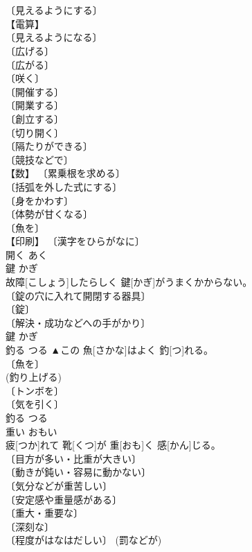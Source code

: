 \documentclass[8pt]{extreport}
\begin{document}
\begin{CJK}{UTF8}{min}
\\	[⇒ひらいた, ひらかれる] 
\\	〔見えるようにする〕 
\\	【電算】 
\\	〔見えるようになる〕 
\\	〔広げる〕 
\\	〔広がる〕 
\\	〔咲く〕 
\\	〔開催する〕 
\\	〔開業する〕 
\\	〔創立する〕 
\\	〔切り開く〕 
\\	〔隔たりができる〕 
\\	〔競技などで〕 
\\	【数】 〔累乗根を求める〕 
\\	〔括弧を外した式にする〕 
\\	〔身をかわす〕 
\\	〔体勢が甘くなる〕 
\\	〔魚を〕 
\\	【印刷】 〔漢字をひらがなに〕 
\\	開く	あく	
\\	鍵	かぎ	
\\	故障[こしょう]したらしく 鍵[かぎ]がうまくかからない。	
\\	〔錠の穴に入れて開閉する器具〕 
\\	〔錠〕 
\\	〔解決・成功などへの手がかり〕 
\\	鍵	かぎ	
\\	釣る	つる	▲この 魚[さかな]はよく 釣[つ]れる。	
\\	〔魚を〕 
\\	(釣り上げる) 
\\	〔トンボを〕 
\\	〔気を引く〕 
\\	[⇒つられる]	釣る	つる	
\\	重い	おもい	
\\	疲[つか]れて 靴[くつ]が 重[おも]く 感[かん]じる。	
\\	〔目方が多い・比重が大きい〕 
\\	〔動きが鈍い・容易に動かない〕 
\\	〔気分などが重苦しい〕 
\\	〔安定感や重量感がある〕 
\\	〔重大・重要な〕 
\\	〔深刻な〕 
\\	〔程度がはなはだしい〕 (罰などが) 

\end{CJK}
\end{document}

